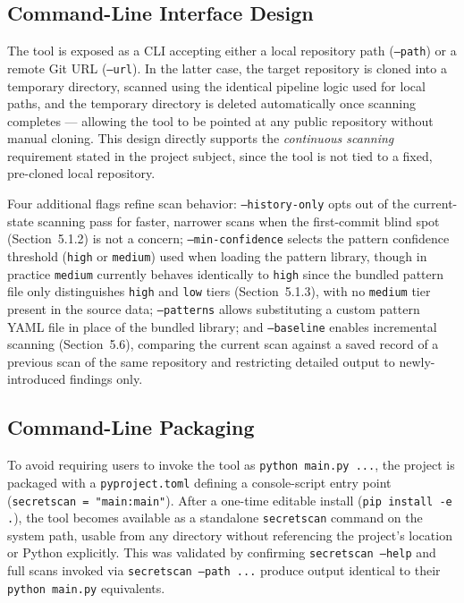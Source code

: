 \documentclass[12pt]{article}
\begin{document}
\subsection{Command-Line Interface Design}

The tool is exposed as a CLI accepting either a local repository path (\texttt{--path}) or a remote Git URL (\texttt{--url}). In the latter case, the target repository is cloned into a temporary directory, scanned using the identical pipeline logic used for local paths, and the temporary directory is deleted automatically once scanning completes --- allowing the tool to be pointed at any public repository without manual cloning. This design directly supports the \emph{continuous scanning} requirement stated in the project subject, since the tool is not tied to a fixed, pre-cloned local repository.

Four additional flags refine scan behavior: \texttt{--history-only} opts out of the current-state scanning pass for faster, narrower scans when the first-commit blind spot (Section~5.1.2) is not a concern; \texttt{--min-confidence} selects the pattern confidence threshold (\texttt{high} or \texttt{medium}) used when loading the pattern library, though in practice \texttt{medium} currently behaves identically to \texttt{high} since the bundled pattern file only distinguishes \texttt{high} and \texttt{low} tiers (Section~5.1.3), with no \texttt{medium} tier present in the source data; \texttt{--patterns} allows substituting a custom pattern YAML file in place of the bundled library; and \texttt{--baseline} enables incremental scanning (Section~5.6), comparing the current scan against a saved record of a previous scan of the same repository and restricting detailed output to newly-introduced findings only.

\subsection{Command-Line Packaging}

To avoid requiring users to invoke the tool as \texttt{python main.py ...}, the project is packaged with a \texttt{pyproject.toml} defining a console-script entry point (\texttt{secretscan = "main:main"}). After a one-time editable install (\texttt{pip install -e .}), the tool becomes available as a standalone \texttt{secretscan} command on the system path, usable from any directory without referencing the project's location or Python explicitly. This was validated by confirming \texttt{secretscan --help} and full scans invoked via \texttt{secretscan --path ...} produce output identical to their \texttt{python main.py} equivalents.
\end{document}
